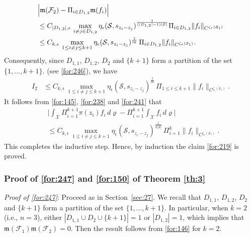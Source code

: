 \documentclass[11 pt]{amsart}
\newcommand{\norm}[1]{\lVert#1\rVert}
\theoremstyle{definition}
\numberwithin{equation}{section}
\begin{document}
\begin{align*}
 &\Big|\mathfrak{m}(\mathcal{F}_2)-\Pi_{i\in D_{1,2}}\mathfrak{m}( f_i)\Big|\notag\\
 &\leq  C_{|D_{1,2}|,\epsilon}\,\max_{i\neq j\in D_{1,2}}\eta_\epsilon (\mathcal{S}, s_{z_i-z_j})^{\frac{1}{(|D_{1,2}|-1)|\mathcal{S}|}}
 \Pi_{i\in D_{1,2}}\norm{f_i}_{C^{\zeta_\epsilon(\mathcal{S}_1)}}\notag\\
&\leq C_{k,\epsilon}\,\max_{1\leq i\neq j\leq k+1}\eta_{\epsilon} (\mathcal{S}, s_{z_i-z_j})^{\frac{1}{lk}}\,
\Pi_{i\in D_{1,2}}\norm{f_i}_{C^{\zeta_\epsilon(\mathcal{S}_1)}}.
\end{align*}
Consequently, since $D_{1,1}$, $D_{1,2}$, $D_2$ and $\{k+1\}$ form a partition of the set $\{1,\dots, k+1\}$. (see \eqref{for:246}), we have
\begin{align}\label{for:241}
 I_2&\leq C_{k,\epsilon}\,\max_{1\leq i\neq j\leq k+1}\eta_{\epsilon} (\mathcal{S}, s_{z_i-z_j})^{\frac{1}{lk}}\,
\Pi_{1\leq i\leq k+1}\norm{f_i}_{C^{\zeta_\epsilon(\mathcal{S}_1)}}.
\end{align}
It follows from \eqref{for:145}, \eqref{for:238} and \eqref{for:241} that
\begin{align*}
 &\Big|\int_{\mathcal{X}} \Pi_{i=1}^{k+1} \pi(z_i)f_i \,d\varrho - \Pi_{i=1}^{k+1} \int_{\mathcal{X}} f_i \,d\varrho\Big|\\
 &\leq C_{k,\epsilon}\,\max_{1\le i\neq j\le k+1}\eta_\epsilon (\mathcal{S}, s_{z_i-z_j})^{\frac{1}{k|\mathcal{S}|}}\,
\Pi_{i=1}^k\norm{f_i}_{C^{\zeta_\epsilon(\mathcal{S}_1)}}.
\end{align*}
This completes the inductive step. Hence, by induction the claim \eqref{for:219} is proved.



\subsubsection{Proof of \eqref{for:247} and \eqref{for:150} of Theorem \ref{th:3}} \emph{Proof of \eqref{for:247}}:
Proceed as in Section~\ref{sec:27}. We recall that $D_{1,1}$, $D_{1,2}$, $D_2$ and $\{k+1\}$ form a partition of the set $\{1,\dots, k+1\}$. In particular, when $k=2$ (i.e., $n=3$), either $|D_{1,1}\cup D_2\cup\{k+1\}|=1$ or $|D_{1,2}|=1$, which implies that $\mathfrak{m}(\mathcal{F}_1)\mathfrak{m}(\mathcal{F}_2)=0$. Then the result follows from \eqref{for:146} for $k=2$.
\end{document}

